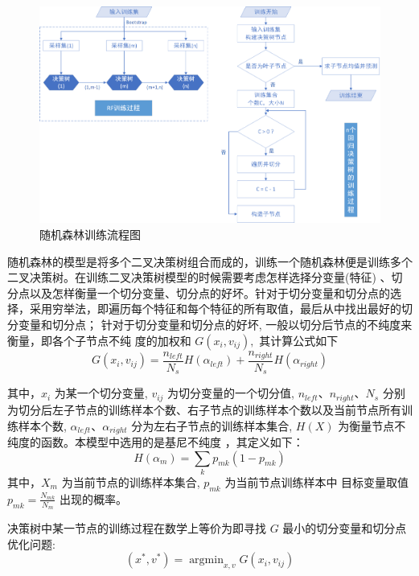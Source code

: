 \documentclass[withoutpreface,bwprint]{cumcmthesis} %
\begin{document}
\begin{figure}[h]
	\centering
	\includegraphics[width=\textwidth]{fig/RFflow.png}
	\caption{随机森林训练流程图}
	\label{fig:RFflow}
\end{figure}


随机森林的模型是将多个二叉决策树组合而成的，训练一个随机森林便是训练多个二叉决策树。在训练二叉决策树模型的时候需要考虑怎样选择分变量(特征) 、切分点以及怎样衡量一个切分变量、切分点的好坏。针对于切分变量和切分点的选择，采用穷举法，即遍历每个特征和每个特征的所有取值，最后从中找出最好的切分变量和切分点； 针对于切分变量和切分点的好坏, 一般以切分后节点的不纯度来衡量，即各个子节点不纯 度的加权和 $G\left(x_{i}, v_{i j}\right),$ 其计算公式如下
\begin{equation}
	G\left(x_{i}, v_{i j}\right)=\frac{n_{l e f t}}{N_{s}} H\left(\alpha_{l e f t}\right)+\frac{n_{r i g h t}}{N_{s}} H\left(\alpha_{r i g h t}\right)
\end{equation}

其中，$x_{i}$ 为某一个切分变量, $v_{i j}$ 为切分变量的一个切分值, $n_{l e f t}$、$n_{r i g h t}$、$N_{s}$ 分别为切分后左子节点的训练样本个数、右子节点的训练样本个数以及当前节点所有训练样本个数, $\alpha_{l e f t}$、$\alpha_{r i g h t}$ 分为左右子节点的训练样本集合, $H(X)$ 为衡量节点不纯度的函数。本模型中选用的是基尼不纯度 \cite{孙傲2019基于信息增益和基尼不纯度的}，其定义如下：
\begin{equation}
H\left(\alpha_{m}\right)=\sum_{k} p_{m k} \left(1-p_{m k}\right)
\end{equation}
其中，$X_{m}$ 为当前节点的训练样本集合, $p_{m k}$ 为当前节点训练样本中 目标变量取值 $p_{m k}=\frac{N_{m k}}{N_{m}}$ 出现的概率。

决策树中某一节点的训练过程在数学上等价为即寻找 $G$ 最小的切分变量和切分点优化问题:
\begin{equation}
\left(x^{*}, v^{*}\right)=\operatorname{argmin}_{x, v} G\left(x_{i}, v_{i j}\right)
\end{equation}
\end{document}
